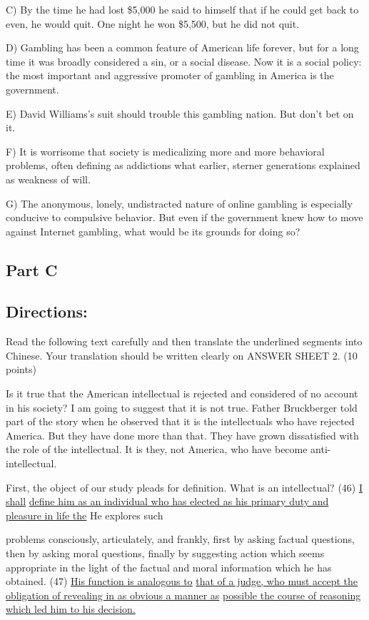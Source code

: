 \documentclass[UTF8,11pt]{ctexart}
\begin{document}
C) By the time he had lost \$5,000 he said to himself that if he could get back to even, he would quit. One night he won \$5,500, but he did not quit.


D) Gambling has been a common feature of American life forever, but for a long time it was broadly considered a sin, or a social disease. Now it is a social policy: the most important and aggressive promoter of gambling in America is the government.


E) David Williams’s suit should trouble this gambling nation. But don’t bet on it.


F) It is worrisome that society is medicalizing more and more behavioral problems, often defining as addictions what earlier, sterner generations explained as weakness of will.


G) The anonymous, lonely, undistracted nature of online gambling is especially conducive to compulsive behavior. But even if the government knew how to move against Internet gambling, what would be its grounds for doing so?


\subsection*{\textbf{Part C}}


\subsection*{\textbf{Directions:}}


Read the following text carefully and then translate the underlined segments into Chinese. Your translation should be written clearly on ANSWER SHEET 2. (10 points)


Is it true that the American intellectual is rejected and considered of no account in his society? I am going to suggest that it is not true. Father Bruckberger told part of the story when he observed that it is the intellectuals who have rejected America. But they have done more than that. They have grown dissatisfied with the role of the intellectual. It is they, not America, who have become anti-intellectual.


First, the object of our study pleads for definition. What is an intellectual? (46) \uline{I shall} \uline{define him as an individual who has elected as his primary duty and pleasure in life the} He explores such


problems consciously, articulately, and frankly, first by asking factual questions, then by asking moral questions, finally by suggesting action which seems appropriate in the light of the factual and moral information which he has obtained. (47) \uline{His function is analogous to} \uline{that of a judge, who must accept the obligation of revealing in as obvious a manner as} \uline{possible the course of reasoning which led him to his decision.}
\end{document}
